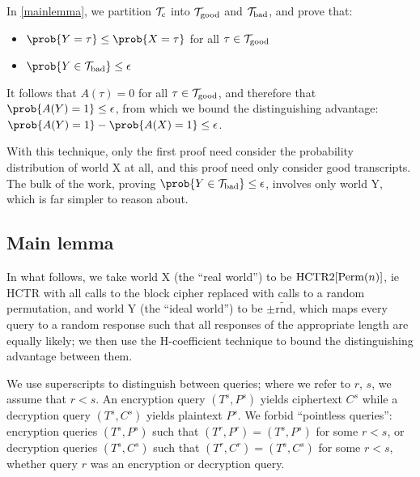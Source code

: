 \documentclass[hctr.tex]{subfiles}
\begin{document}
In \autoref{mainlemma}, we partition \(\mathcal{T}_\mathrm{c}\) into \(\mathcal{T}_\mathrm{good}\) and \(\mathcal{T}_\mathrm{bad}\),
and prove that:
\begin{itemize}
    \item \(\prob{Y = \tau} \leq \prob{X = \tau}\) for all \(\tau \in \mathcal{T}_\mathrm{good}\)
    \item \(\prob{Y \in \Tb} \leq \epsilon\)
\end{itemize}
It follows that \(A(\tau) = 0\) for all \(\tau \in \mathcal{T}_\mathrm{good}\),
and therefore that \(\prob{A(Y) = 1} \leq \epsilon\),
from which we bound the distinguishing advantage:
\(\prob{A(Y) = 1} - \prob{A(X) = 1} \leq \epsilon\).

With this technique, only the first proof
need consider the probability
distribution of world X at all,
and this proof need only consider good transcripts.
The bulk of the work, proving
\(\prob{Y \in \Tb} \leq \epsilon\),
involves only world Y, which is far simpler
to reason about.

\subsection{Main lemma}\label{mainlemma}
In what follows, we take world X (the ``real world'') 
to be \(\operatorname{HCTR2}[\operatorname{Perm}(n)]\),
ie HCTR with all calls to the block cipher
replaced with calls to a random permutation,
and world Y (the ``ideal world'') to be \(\pm\widetilde{\mathrm{rnd}}\),
which maps every query to a random response such that
all responses of the appropriate length are equally likely;
we then use the H-coefficient technique to bound
the distinguishing advantage between them.

We use superscripts to distinguish between queries;
where we refer to \(r\), \(s\), we assume that \(r < s\).
An encryption query \((T^s, P^s)\) yields ciphertext \(C^s\)
while a decryption query \((T^s, C^s)\)
yields plaintext \(P^s\).
We forbid ``pointless queries'':
encryption queries \((T^s, P^s)\)
such that \((T^r, P^r) = (T^s, P^s)\) for some \(r < s\), 
or decryption queries \((T^s, C^s)\)
such that \((T^r, C^r) = (T^s, C^s)\) for some \(r < s\),
whether query \(r\) was an encryption or decryption query.
\end{document}
